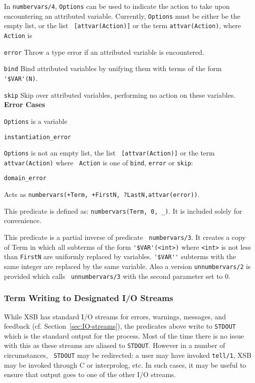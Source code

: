 \begin{description}
In {\tt numbervars/4}, {\tt Options} can be used to indicate the
action to take upon encountering an attributed variable.  Currently,
{\tt Options} must be either be the empty list, or the list {\tt
  [attvar(Action)]} or the term {\tt attvar(Action)}, where {\tt
  Action} is 
\bi
\item {\tt error} Throw a type error if an attributed variable is
  encountered.
\item {\tt bind} Bind attributed variables by unifying them with terms
  of the form \verb|'$VAR'(N)|.
\item {\tt skip} Skip over attributed variables, performing no action
  on these variables.
\ei
{\bf Error Cases}
\bi
\item 	{\tt Options} is a variable
\bi
\item {\tt instantiation\_error}
\ei
\item {\tt Options} is not an empty list, the list {\tt
  [attvar(Action)]} or the term {\tt attvar(Action)} where {\tt
  Action} is one of {\tt bind}, {\tt error} or {\tt skip}:
 \bi
\item 	{\tt domain\_error}
\ei
\ei

%
Acts as {\tt numbervars(+Term, +FirstN, ?LastN,attvar(error))}.

    This predicate is defined as: {\tt numbervars(Term, 0, \_)}.  It
    is included solely for convenience.

    This predicate is a partial inverse of predicate {\tt
    numbervars/3}.  It creates a copy of Term in which all subterms of
    the form \verb|'$VAR'(<int>)| where \verb|<int>| is not less than
    {\tt FirstN} are uniformly replaced by variables.  \verb|'$VAR''|
    subterms with the same integer are replaced by the same variable.
    Also a version {\tt unnumbervars/2} is provided which calls {\tt
    unnumbervars/3} with the second parameter set to 0.

\end{description}

\subsubsection{Term Writing to Designated I/O Streams}
%
While XSB has standard I/O streams for errors, warnings, messages, and
feedback (cf. Section~\ref{sec:IO-streams}), the predicates above
write to {\tt STDOUT} which is the standard output for the process.
Most of the time there is no issue with this as these streams are
aliased to {\tt STDOUT}.  However in a number of circumstances, {\tt
  STDOUT} may be redirected: a user may have invoked {\tt tell/1}, XSB
may be invoked through C or interprolog, etc.  In such cases, it may
be useful to ensure that output goes to one of the other I/O streams.  

